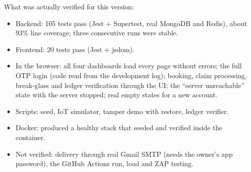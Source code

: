 What was actually verified for this version:

\begin{itemize}
  \item Backend: 105 tests pass (Jest + Supertest, real MongoDB and Redis),
    about 93\% line coverage; three consecutive runs were stable.
  \item Frontend: 20 tests pass (Jest + jsdom).
  \item In the browser: all four dashboards load every page without errors;
    the full OTP login (code read from the development log); booking,
    claim processing, break-glass and ledger verification through the UI; the
    ``server unreachable'' state with the server stopped; real empty states for a
    new account.
  \item Scripts: seed, IoT simulator, tamper demo with restore, ledger verifier.
  \item Docker:  produced a healthy stack that
    seeded and verified inside the container.
  \item Not verified: delivery through real Gmail SMTP (needs the owner's app
    password), the GitHub Actions run, load and ZAP testing.
\end{itemize}

